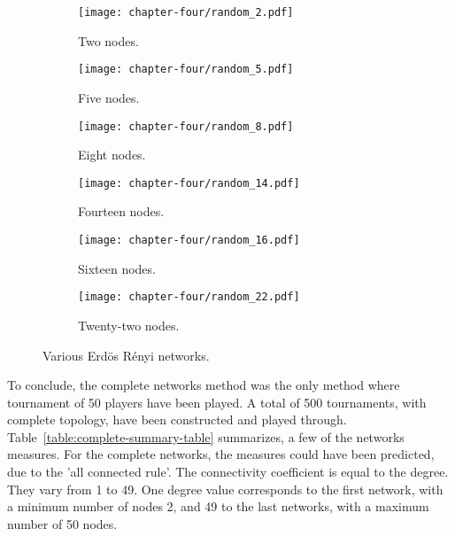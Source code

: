 \begin{figure}[H]
	\centering
	\begin{subfigure}[t]{0.30\textwidth}
		\centering
		\texttt{[image: chapter-four/random\_2.pdf]}
		\caption{Two nodes.}
	\end{subfigure}
	\hfill
	\begin{subfigure}[t]{0.30\textwidth}\centering
		\centering
		\texttt{[image: chapter-four/random\_5.pdf]}
		\caption{Five nodes.}
	\end{subfigure}
	\hfill
	\begin{subfigure}[t]{0.30\textwidth}\centering
		\centering
		\texttt{[image: chapter-four/random\_8.pdf]}
		\caption{Eight nodes.}
	\end{subfigure}
	\hfill
	\begin{subfigure}[t]{0.30\textwidth}\centering
		\centering
		\texttt{[image: chapter-four/random\_14.pdf]}
		\caption{Fourteen nodes.}
	\end{subfigure}
	\hfill
	\begin{subfigure}[t]{0.30\textwidth}\centering
		\centering
		\texttt{[image: chapter-four/random\_16.pdf]}
		\caption{Sixteen nodes.}
	\end{subfigure}
	\hfill
	\begin{subfigure}[t]{0.30\textwidth}\centering
		\centering
		\texttt{[image: chapter-four/random\_22.pdf]}
		\caption{Twenty-two nodes.}
	\end{subfigure}
	\caption{Various Erd\"{o}s R\'{e}nyi networks.}
	\label{random_networks_illustration}
\end{figure}

To conclude, the complete networks method was the only method where tournament
of 50 players have been played. A total of 500 tournaments, with complete topology,
have been constructed and played through. Table~\ref{table:complete-summary-table}
summarizes, a few of the networks measures. For the complete networks, the measures
could have been predicted, due to the 'all connected rule'. The connectivity
coefficient is equal to the degree. They vary from 1 to 49. One degree value
corresponds to the first network, with a minimum number of nodes 2, and 49 to
the last networks, with a maximum number of 50 nodes.

